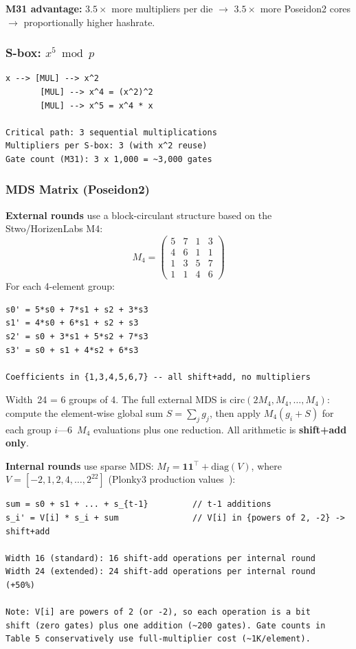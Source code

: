 \documentclass[11pt,a4paper]{article}
\begin{document}
\textbf{M31 advantage:} $3.5\times$ more multipliers per die $\to$ $3.5\times$ more Poseidon2 cores $\to$ proportionally higher hashrate.

\subsubsection{S-box: $x^5 \bmod p$}

\begin{Verbatim}[fontsize=\small]
x --> [MUL] --> x^2
       [MUL] --> x^4 = (x^2)^2
       [MUL] --> x^5 = x^4 * x

Critical path: 3 sequential multiplications
Multipliers per S-box: 3 (with x^2 reuse)
Gate count (M31): 3 x 1,000 = ~3,000 gates
\end{Verbatim}

\subsubsection{MDS Matrix (Poseidon2)}

\textbf{External rounds} use a block-circulant structure based on the Stwo/HorizenLabs M4:
\[
M_4 = \begin{pmatrix} 5 & 7 & 1 & 3 \\ 4 & 6 & 1 & 1 \\ 1 & 3 & 5 & 7 \\ 1 & 1 & 4 & 6 \end{pmatrix}
\]
For each 4-element group:
\begin{Verbatim}[fontsize=\small]
s0' = 5*s0 + 7*s1 + s2 + 3*s3
s1' = 4*s0 + 6*s1 + s2 + s3
s2' = s0 + 3*s1 + 5*s2 + 7*s3
s3' = s0 + s1 + 4*s2 + 6*s3

Coefficients in {1,3,4,5,6,7} -- all shift+add, no multipliers
\end{Verbatim}
Width~24 = 6 groups of 4. The full external MDS is $\mathrm{circ}(2M_4, M_4, \ldots, M_4)$: compute the element-wise global sum $S = \sum_j g_j$, then apply $M_4(g_i + S)$ for each group $i$---6~$M_4$ evaluations plus one reduction. All arithmetic is \textbf{shift+add only}.

\textbf{Internal rounds} use sparse MDS: $M_I = \mathbf{1}\mathbf{1}^\top + \mathrm{diag}(V)$, where $V = [-2, 1, 2, 4, \ldots, 2^{22}]$ (Plonky3 production values~\cite{plonky3}):
\begin{Verbatim}[fontsize=\small]
sum = s0 + s1 + ... + s_{t-1}         // t-1 additions
s_i' = V[i] * s_i + sum               // V[i] in {powers of 2, -2} -> shift+add

Width 16 (standard): 16 shift-add operations per internal round
Width 24 (extended): 24 shift-add operations per internal round  (+50%)

Note: V[i] are powers of 2 (or -2), so each operation is a bit
shift (zero gates) plus one addition (~200 gates). Gate counts in
Table 5 conservatively use full-multiplier cost (~1K/element).
\end{Verbatim}
\end{document}
